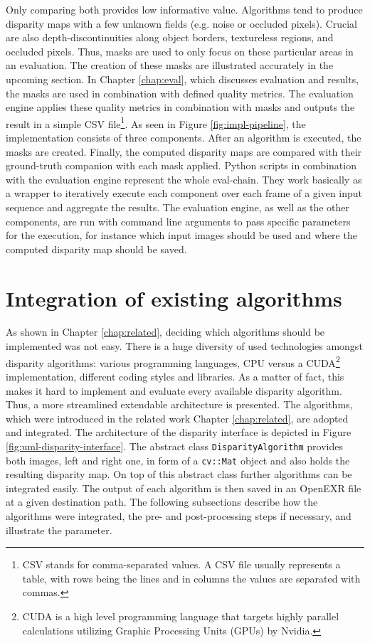 Only comparing both provides low informative value.
Algorithms tend to produce disparity maps with a few unknown fields (e.g. noise or occluded pixels).
Crucial are also depth-discontinuities along object borders, textureless regions, and occluded pixels.
Thus, masks are used to only focus on these particular areas in an evaluation.
The creation of these masks are illustrated accurately in the upcoming section.
In Chapter \ref{chap:eval}, which discusses evaluation and results, the masks are used in combination with defined quality metrics.
The evaluation engine applies these quality metrics in combination with masks and outputs the result in a simple CSV file\footnote{CSV stands for comma-separated values. A CSV file usually represents a table, with rows being the lines and in columns the values are separated with commas.}.
As seen in Figure \ref{fig:impl-pipeline}, the implementation consists of three components.
After an algorithm is executed, the masks are created.
Finally, the computed disparity maps are compared with their ground-truth companion with each mask applied.
\newline\newline\noindent Python scripts in combination with the evaluation engine represent the whole eval-chain.
They work basically as a wrapper to iteratively execute each component over each frame of a given input sequence and aggregate the results.
The evaluation engine, as well as the other components, are run with command line arguments to pass specific parameters for the execution, for instance which input images should be used and where the computed disparity map should be saved.

\section{Integration of existing algorithms}

As shown in Chapter \ref{chap:related}, deciding which algorithms should be implemented was not easy.
There is a huge diversity of used technologies amongst disparity algorithms: various programming languages, CPU versus a CUDA\footnote{CUDA is a high level programming language that targets highly parallel calculations utilizing Graphic Processing Units (GPUs) by Nvidia.} implementation, different coding styles and libraries.
As a matter of fact, this makes it hard to implement and evaluate every available disparity algorithm.
Thus, a more streamlined extendable architecture is presented.
The algorithms, which were introduced in the related work Chapter \ref{chap:related}, are adopted and integrated.
The architecture of the disparity interface is depicted in Figure \ref{fig:uml-disparity-interface}.
\newline\newline\noindent The abstract class \texttt{DisparityAlgorithm} provides both images, left and right one, in form of a \texttt{cv::Mat} object and also holds the resulting disparity map.
On top of this abstract class further algorithms can be integrated easily.
The output of each algorithm is then saved in an OpenEXR file at a given destination path.
The following subsections describe how the algorithms were integrated, the pre- and post-processing steps if necessary, and illustrate the parameter.

